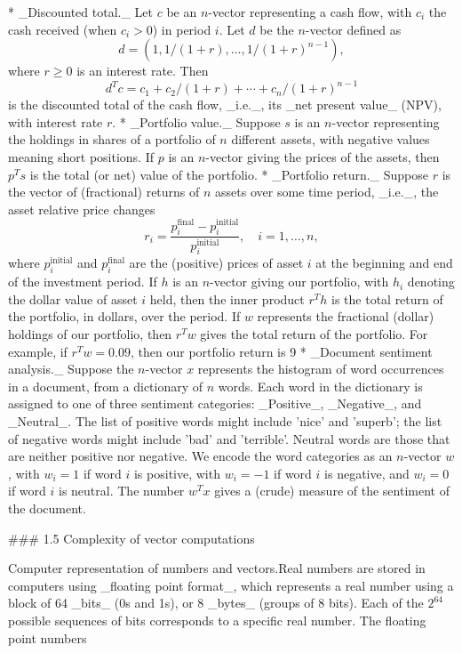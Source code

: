 * _Discounted total._ Let \(c\) be an \(n\)-vector representing a cash flow, with \(c_{i}\) the cash received (when \(c_{i}>0\)) in period \(i\). Let \(d\) be the \(n\)-vector defined as \[d=(1,1/(1+r),\ldots,1/(1+r)^{n-1}),\] where \(r\geq 0\) is an interest rate. Then \[d^{T}c=c_{1}+c_{2}/(1+r)+\cdots+c_{n}/(1+r)^{n-1}\] is the discounted total of the cash flow, _i.e._, its _net present value_ (NPV), with interest rate \(r\).
* _Portfolio value._ Suppose \(s\) is an \(n\)-vector representing the holdings in shares of a portfolio of \(n\) different assets, with negative values meaning short positions. If \(p\) is an \(n\)-vector giving the prices of the assets, then \(p^{T}s\) is the total (or net) value of the portfolio.
* _Portfolio return._ Suppose \(r\) is the vector of (fractional) returns of \(n\) assets over some time period, _i.e._, the asset relative price changes \[r_{i}=\frac{p_{i}^{\text{final}}-p_{i}^{\text{initial}}}{p_{i}^{\text{initial}} },\quad i=1,\ldots,n,\] where \(p_{i}^{\text{initial}}\) and \(p_{i}^{\text{final}}\) are the (positive) prices of asset \(i\) at the beginning and end of the investment period. If \(h\) is an \(n\)-vector giving our portfolio, with \(h_{i}\) denoting the dollar value of asset \(i\) held, then the inner product \(r^{T}h\) is the total return of the portfolio, in dollars, over the period. If \(w\) represents the fractional (dollar) holdings of our portfolio, then \(r^{T}w\) gives the total return of the portfolio. For example, if \(r^{T}w=0.09\), then our portfolio return is 9%
* _Document sentiment analysis._ Suppose the \(n\)-vector \(x\) represents the histogram of word occurrences in a document, from a dictionary of \(n\) words. Each word in the dictionary is assigned to one of three sentiment categories: _Positive_, _Negative_, and _Neutral_. The list of positive words might include 'nice' and 'superb'; the list of negative words might include 'bad' and 'terrible'. Neutral words are those that are neither positive nor negative. We encode the word categories as an \(n\)-vector \(w\), with \(w_{i}=1\) if word \(i\) is positive, with \(w_{i}=-1\) if word \(i\) is negative, and \(w_{i}=0\) if word \(i\) is neutral. The number \(w^{T}x\) gives a (crude) measure of the sentiment of the document.

### 1.5 Complexity of vector computations

Computer representation of numbers and vectors.Real numbers are stored in computers using _floating point format_, which represents a real number using a block of 64 _bits_ (0s and 1s), or 8 _bytes_ (groups of 8 bits). Each of the \(2^{64}\) possible sequences of bits corresponds to a specific real number. The floating point numbers 